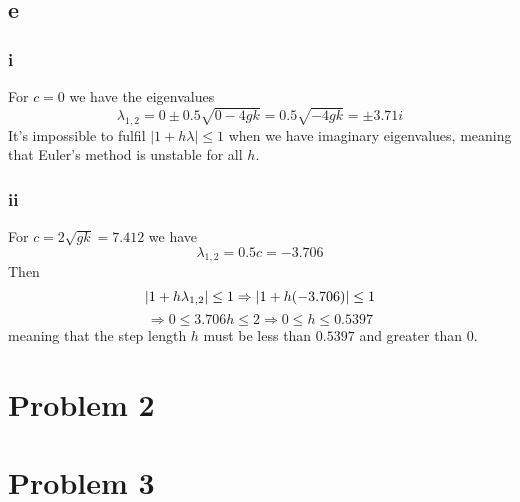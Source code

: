 \documentclass[11pt]{article}
\begin{document}
\subsection*{e}
\subsubsection*{i}
For $c=0$ we have the eigenvalues
\begin{equation}
\lambda_{1,2} = 0 \pm 0.5\sqrt{0-4gk} = 0.5\sqrt{-4gk} = \pm 3.71i
\end{equation}
It's impossible to fulfil $|1+h\lambda|\leq 1$ when we have imaginary eigenvalues, meaning that Euler's method is unstable for all $h$.

\subsubsection*{ii}
For $c =2\sqrt{gk} = 7.412$ we have
\begin{equation}
\lambda_{1,2} = 0.5c = -3.706
\end{equation}
Then
\begin{equation}
|1 + h\lambda_{1,2}| \leq 1 \Rightarrow |1+h(-3.706)| \leq 1 \newline
\end{equation}
\begin{equation}
\Rightarrow 0 \leq 3.706h \leq 2 \Rightarrow 0 \leq h \leq 0.5397
\end{equation}
meaning that the step length $h$ must be less than $0.5397$ and greater than $0$.

\section*{Problem 2}


\section*{Problem 3}
\end{document}
